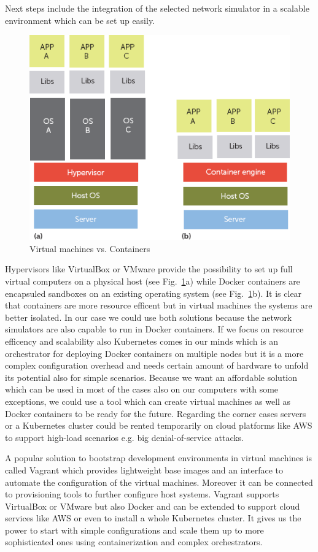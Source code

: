\documentclass[conference]{IEEEtran}
\begin{document}
Next steps include the integration of the selected network simulator in a scalable environment which can be set up easily. 

\begin{figure}[htbp]
\centerline{\includegraphics[scale=0.5]{docker_vm.png}}
\caption{Virtual machines vs. Containers \cite{b8}}
\label{docker-vm}
\end{figure}

Hypervisors like VirtualBox or VMware provide the possibility to set up full virtual computers on a physical host (see Fig.~\ref{docker-vm}a) while Docker containers are encapsuled sandboxes on an existing operating system (see Fig.~\ref{docker-vm}b). It is clear that containers are more resource efficent but in virtual machines the systems are better isolated. In our case we could use both solutions because the network simulators are also capable to run in Docker containers. If we focus on resource efficency and scalability also Kubernetes comes in our minds which is an orchestrator for deploying Docker containers on multiple nodes but it is a more complex configuration overhead and needs certain amount of hardware to unfold its potential also for simple scenarios. Because we want an affordable solution which can be used in most of the cases also on our computers with some exceptions, we could use a tool which can create virtual machines as well as Docker containers to be ready for the future. Regarding the corner cases servers or a Kubernetes cluster could be rented temporarily on cloud platforms like AWS to support high-load scenarios e.g. big denial-of-service attacks. \cite{b8}

A popular solution to bootstrap development environments in virtual machines is called Vagrant which provides lightweight base images and an interface to automate the configuration of the virtual machines. Moreover it can be connected to provisioning tools to further configure host systems. Vagrant supports VirtualBox or VMware but also Docker and can be extended to support cloud services like AWS or even to install a whole Kubernetes cluster. It gives us the power to start with simple configurations and scale them up to more sophisticated ones using containerization and complex orchestrators. \cite{b9} \cite{b10}
\end{document}
